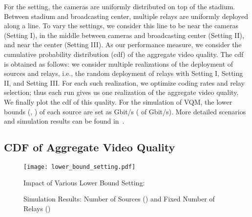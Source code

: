 \documentclass[conference]{IEEEtran}
\begin{document}
For the setting, the cameras are uniformly distributed on top of the stadium. Between stadium and broadcasting center, multiple relays are uniformly deployed along a line. To vary the settings, we consider this line to be near the cameras (Setting I), in the middle between cameras and broadcasting center (Setting II), and near the center (Setting III).
As our performance measure, we consider the cumulative probability distribution (cdf) of the aggregate video quality.
The cdf is obtained as follows: we consider multiple realizations of the deployment of sources and relays, i.e., the random deployment of relays with Setting I, Setting II, and Setting III.
For each such realization, we optimize coding rates and relay selection; thus each run gives us one realization of the aggregate video quality. We finally plot the cdf of this quality. For the simulation of \textsf{VQM}, the lower bounds (, ) of each source are set as  Gbit/s ( of  Gbit/s).
More detailed scenarios and simulation results can be found in~\cite{kim12tbc}.


\subsection{CDF of Aggregate Video Quality}\label{sec:sim01}


\begin{figure}[t!]
	\begin{center}
		\texttt{[image: lower\_bound\_setting.pdf]}
	\end{center}
	\caption{Impact of Various Lower Bound Setting: }
	\label{fig:lower}
\end{figure}	

\begin{figure*}[t!]
	\centering
	\caption{Simulation Results: Number of Sources () and Fixed Number of Relays ()}
	\label{fig:cdf_msmr_r}
\end{figure*}
\end{document}
